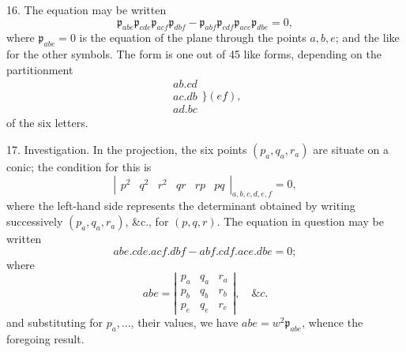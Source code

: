 \documentclass[11pt,a4paper]{article}
\newcommand{\Det}[1]{\left|\begin{matrix}#1\end{matrix}\right|}
\newcommand{\surf}[1]{\par\smallskip\noindent{\itshape \{Surface $#1$.\}}\par\smallskip}
\newcommand{\p}{\mathfrak p}
\begin{document}
16. The equation may be written
\[
\p_{abe}\p_{cde}\p_{acf}\p_{dbf}
-\p_{abf}\p_{cdf}\p_{ace}\p_{dbe}=0,
\]
where $\p_{abe}=0$ is the equation of the plane through the points $a,b,e$; and the
like for the other symbols. The form is one out of 45 like forms, depending on the
partitionment
\[
\begin{matrix}
ab.cd\\
ac.db\\
ad.bc
\end{matrix}\Bigg\}(ef),
\]
of the six letters.

17. Investigation. In the projection, the six points $(p_a,q_a,r_a)$ are situate on
a conic; the condition for this is
\[
\Det{p^2&q^2&r^2&qr&rp&pq}_{a,b,c,d,e,f}=0,
\]
where the left-hand side represents the determinant obtained by writing successively
$(p_a,q_a,r_a)$, \&c., for $(p,q,r)$. The equation in question may be written
\[
abe.cde.acf.dbf-abf.cdf.ace.dbe=0;
\]
where
\[
abe=\Det{p_a&q_a&r_a\\p_b&q_b&r_b\\p_e&q_e&r_e},\quad \&c.
\]
and substituting for $p_a,\ldots$, their values, we have $abe=w^2\p_{abe}$, whence
the foregoing result.
\surf{abcdef}
\end{document}

